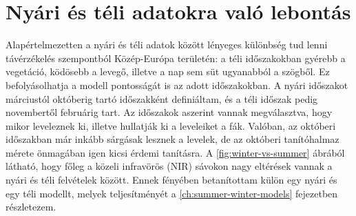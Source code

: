 \section{Nyári és téli adatokra való lebontás}

Alapértelmezetten a nyári és téli adatok között lényeges különbség tud lenni távérzékelés szempontból Közép-Európa területén: a téli időszakokban gyérebb a vegetáció, ködösebb a levegő, illetve a nap sem süt ugyanabból a szögből. Ez befolyásolhatja a modell pontosságát is az adott időszakokban. A nyári időszakot márciustól októberig tartó időszakként definiáltam, és a téli időszak pedig novembertől februárig tart. Az időszakok aszerint vannak megválasztva, hogy mikor leveleznek ki, illetve hullatják ki a leveleiket a fák. Valóban, az októberi időszakban már inkább sárgásak lesznek a levelek, de az októberi tanítóhalmaz mérete önmagában igen kicsi érdemi tanításra. A \ref{fig:winter-vs-summer} ábrából látható, hogy főleg a közeli infravörös (NIR) sávokon nagy eltérések vannak a nyári és téli felvételek között. Ennek fényében betanítottam külön egy nyári és egy téli modellt, melyek teljesítményét a \ref{ch:summer-winter-models} fejezetben részletezem.

